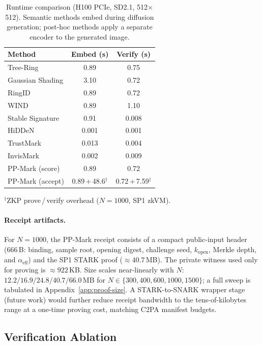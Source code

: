 \documentclass{article}
\theoremstyle{plain}
\theoremstyle{definition}
\theoremstyle{remark}
\begin{document}
\begin{table}[t]
\centering
\caption{Runtime comparison (H100 PCIe, SD2.1, 512$\times$512).
Semantic methods embed during diffusion generation; post-hoc methods apply a separate encoder to the generated image.}
\label{tab:runtime}
\small
\begin{tabular}{lcc}
\toprule
Method & Embed (s) & Verify (s) \\
\midrule
Tree-Ring & 0.89 & 0.75 \\
Gaussian Shading & 3.10 & 0.72 \\
RingID & 0.89 & 0.72 \\
WIND & 0.89 & 1.10 \\
Stable Signature & 0.91 & 0.008 \\
HiDDeN & 0.001 & 0.001 \\
TrustMark & 0.013 & 0.004 \\
InvisMark & 0.002 & 0.009 \\
\midrule
PP-Mark (score) & 0.89 & 0.72 \\
PP-Mark (accept) & 0.89\,{+}\,48.6$^{\dagger}$ & 0.72\,{+}\,7.59$^{\dagger}$ \\
\bottomrule
\end{tabular}
\vspace{2pt}

{\footnotesize $^{\dagger}$ZKP prove\,/\,verify overhead ($N{=}1000$, SP1 zkVM).}
\vskip -0.1in
\end{table}

\paragraph{Receipt artifacts.} \label{sec:proof-size}
For $N{=}1000$, the PP-Mark receipt consists of a compact public-input header (666\,B: binding, sample root, opening digest, challenge seed, $k_{\mathrm{open}}$, Merkle depth, and $\alpha_{\mathrm{eff}}$) and the SP1 STARK proof ($\approx\!40.7$\,MB). The private witness used only for proving is $\approx\!922$\,KB. Size scales near-linearly with $N$: $12.2/16.9/24.8/40.7/66.0$\,MB for $N\in\{300,400,600,1000,1500\}$; a full sweep is tabulated in Appendix~\ref{app:proof-size}. A STARK-to-SNARK wrapper stage (future work) would further reduce receipt bandwidth to the tens-of-kilobytes range at a one-time proving cost, matching C2PA manifest budgets.

\subsection{Verification Ablation}\label{sec:sig-vs-zkp}
\end{document}
